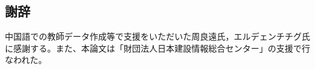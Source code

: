 \documentclass[review]{elsarticle}
\begin{document}
\begin{CJK}{UTF8}{min}
\section*{謝辞}\label{acknowledgements}

中国語での教師データ作成等で支援をいただいた周良遠氏，エルデェンチチグ氏に感謝する。また、本論文は「財団法人日本建設情報総合センター」の支援で行なわれた。

\clearpage



\end{CJK}
\end{document}
